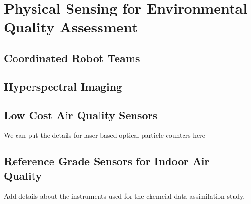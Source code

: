 \chapter{Physical Sensing for Environmental Quality Assessment}\label{ch:physical-sensing}


\section{Coordinated Robot Teams}

\section{Hyperspectral Imaging}

\section{Low Cost Air Quality Sensors}

We can put the details for laser-based optical particle counters here

\section{Reference Grade Sensors for Indoor Air Quality}

Add details about the instruments used for the chemcial data assimilation study.



